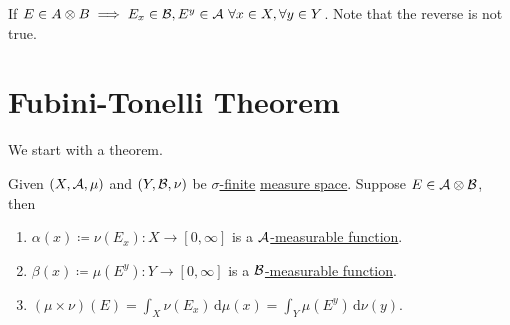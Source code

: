 \begin{prev}
	If \(E\in A\otimes B\implies E_{x} \in \mathcal{\MakeUppercase{b}} , E^y\in \mathcal{\MakeUppercase{a}}\ \forall x\in X, \forall y\in Y\).
	Note that the reverse is not true.
\end{prev}

\section{Fubini-Tonelli Theorem}
We start with a theorem.

\begin{theorem}\label{thm:Tonelli-for-characteristic-functions}
	Given \((X, \mathcal{\MakeUppercase{a}} , \mu )\) and \((Y, \mathcal{\MakeUppercase{b}} , \nu )\) be \hyperref[def:sigma-finite-measure]{\(\sigma\)-finite}
	\hyperref[def:measure-space]{measure space}. Suppose \(E\in \mathcal{\MakeUppercase{a}} \otimes \mathcal{\MakeUppercase{b}} \), then
	\begin{enumerate}[(1)]
		\item \(\alpha (x)\coloneqq \nu (E_x)\colon X\to [0, \infty ]\) is a \hyperref[def:A-measurable-function]{\(\mathcal{\MakeUppercase{a}}\)-measurable function}.
		\item \(\beta (x)\coloneqq \mu (E^y)\colon Y\to [0, \infty ]\) is a \hyperref[def:A-measurable-function]{\(\mathcal{\MakeUppercase{b}}\)-measurable function}.
		\item \((\mu \times \nu) (E) = \int_X \nu (E_x)\,\mathrm{d} \mu(x) = \int _Y \mu (E^y)\,\mathrm{d} \nu (y)\).
	\end{enumerate}
\end{theorem}
